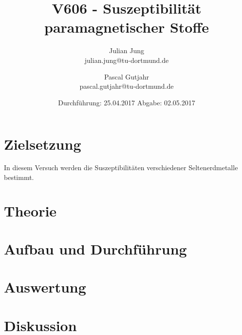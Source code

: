 

\title{V606 - Suszeptibilität paramagnetischer Stoffe}
\author{Julian Jung \\ julian.jung@tu-dortmund.de
  \and Pascal Gutjahr \\ pascal.gutjahr@tu-dortmund.de}
  \date{Durchführung: 25.04.2017
  \hspace{3em}
  Abgabe: 02.05.2017}
  
\maketitle
\newpage
\tableofcontents
\newpage
\section{Zielsetzung}
In diesem Versuch werden die Suszeptibilitäten verschiedener Seltenerdmetalle
bestimmt.
\section{Theorie}
 
\section{Aufbau und Durchführung}
 
\section{Auswertung}
\section{Diskussion}
% 
\printbibliography

